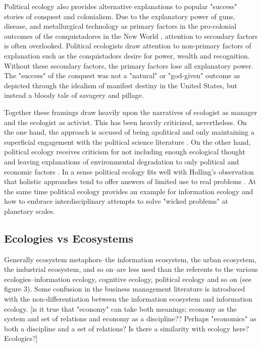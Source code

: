 Political ecology also provides alternative explanations to popular "success" stories of conquest and colonialism. Due to the explanatory power of guns, disease, and metallurgical technology as primary factors in the pro-colonial outcomes of the conquistadores in the New World \citep[cf.][]{diamond_1997}, attention to secondary factors is often overlooked. Political ecologists draw attention to non-primary factors of explanation such as the conquistadors desire for power, wealth and recognition. Without these secondary factors, the primary factors lose all explanatory power. The "success" of the conquest was not a "natural" or "god-given" outcome as depicted through the idealism of manifest destiny in the United States, but instead a bloody tale of savagery and pillage. 

Together these framings draw heavily upon the narratives of ecologist as manager and the ecologist as activist. This has been heavily criticized, nevertheless. On the one hand, the approach is accused of being apolitical and only maintaining a superficial engagement with the political science literature \citep{walker_2007}. On the other hand, political ecology receives criticism for not including enough ecological thought and leaving explanations of environmental degradation to only political and economic factors \citep{vayda_1999,walker_2005}. In a sense political ecology fits well with Holling's observation that holistic approaches tend to offer answers of limited use to real problems \citep{holling_1998}. At the same time political ecology provides an example for information ecology and how to embrace interdisciplinary attempts to solve "wicked problems" at planetary scales.

\subsection{Ecologies vs Ecosystems}

Generally ecosystem metaphors--the information ecosystem, the urban ecosystem, the industrial ecosystem, and so on--are less used than the referents to the various ecologies--information ecology, cognitive ecology, political ecology and so on (see figure 3). Some confusion in the business management literature is introduced with the non-differentiation between the information ecosystem and information ecology. [is it true that "economy" can take both meanings; economy as the system and set of relations and economy as a discipline?? Perhaps "economics" as both a discipline and a set of relations? Is there a similarity with ecology here? Ecologics?]

